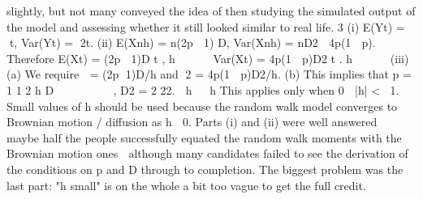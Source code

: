 slightly, but not many conveyed the idea of then studying the simulated output of the
model and assessing whether it still looked similar to real life.
3 (i) E(Yt) = t, Var(Yt) = 2t.
(ii) E(Xnh) = n(2p  1) D, Var(Xnh) = nD2  4p(1  p).
Therefore E(Xt) = (2p  1)D t ,
h
 
 
Var(Xt) = 4p(1  p)D2 t .
h
 
 
(iii) (a) We require  = (2p 1)D/h and 2 = 4p(1  p)D2/h.
(b) This implies that p = 1 1
2
h
D
     
 
, D2 = 2 22.  h   h
This applies only when 0  |h| < 1. Small values of h should be used
because the random walk model converges to Brownian motion /
diffusion as h  0.
Parts (i) and (ii) were well answered  maybe half the people successfully equated
the random walk moments with the Brownian motion ones  although many
candidates failed to see the derivation of the conditions on p and D through to
completion.
The biggest problem was the last part: "h small" is on the whole a bit too vague to get
the full credit.
